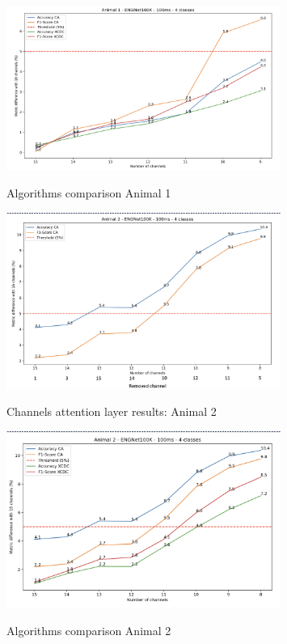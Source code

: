 \documentclass{Configuration_Files/PoliMi3i_thesis}
\begin{document}
\begin{figure}[H]
    \centering
    \includegraphics[width=0.8\textwidth]{Results Matteo/figure12}
    \label{fiure_12}
    \caption{Algorithms comparison Animal 1}

\end{figure}

\begin{figure}[H]
    \centering
    \includegraphics[width=0.8\textwidth]{Results Matteo/figure13}
    \label{fiure_13}

    \caption{Channels attention layer results: Animal 2}

\end{figure}

\begin{figure}[H]
    \centering
    \includegraphics[width=0.8\textwidth]{Results Matteo/figure14}
    \label{fiure_14}
    \caption{Algorithms comparison Animal 2}
\end{figure}
\end{document}
